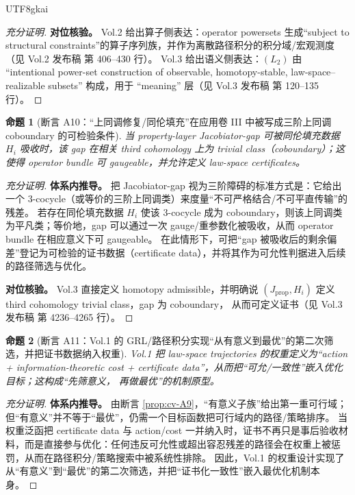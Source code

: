 \documentclass[12pt]{article}
\newtheorem{proposition}{命题}[section]
\begin{document}
\begin{CJK*}{UTF8}{gkai}
\begin{proof}[充分证明]
\textbf{对位核验。}
Vol.2 给出算子侧表达：operator powersets 生成“subject to structural constraints”的算子序列族，并作为离散路径积分的积分域/宏观测度（见 Vol.2
  发布稿\cite{GaoZhengAppVol2} 第 406--430 行）。
Vol.3 给出语义侧表达：$(L_2)$ 由 “intentional power-set construction of observable, homotopy-stable, law-space--realizable
  subsets” 构成，用于 “meaning” 层（见 Vol.3 发布稿\cite{GaoZhengAppVol3} 第 120--135 行）。
\end{proof}

\begin{proposition}[断言 A10：“上同调修复/同伦填充”在应用卷 III 中被写成三阶上同调 coboundary 的可检验条件]\label{prop:cv-A10}
当 property-layer Jacobiator-gap 可被同伦填充数据 $H_i$ 吸收时，该 gap 在相关 third cohomology 上为 trivial class（coboundary）；这使得 operator
  bundle 可 gaugeable，并允许定义 law-space certificates。
\end{proposition}

\begin{proof}[充分证明]
\textbf{体系内推导。}
把 Jacobiator-gap 视为三阶障碍的标准方式是：它给出一个 3-cocycle（或等价的三阶上同调类）来度量“不可严格结合/不可平直传输”的残差。
若存在同伦填充数据 $H_i$ 使该 3-cocycle 成为 coboundary，则该上同调类为平凡类；等价地，gap 可以通过一次 gauge/重参数化被吸收，从而 operator bundle 在相应意义下可 gaugeable。
在此情形下，可把“gap 被吸收后的剩余偏差”登记为可检验的证书数据（certificate data），并将其作为可允性判据进入后续的路径筛选与优化。

\textbf{对位核验。}
Vol.3 直接定义 homotopy admissible，并明确说 $(J_{\mathrm{prop}},H_i)$ 定义 third cohomology trivial class，gap 为 coboundary，
  从而可定义证书（见 Vol.3 发布稿\cite{GaoZhengAppVol3} 第 4236--4265 行）。
\end{proof}

\begin{proposition}[断言 A11：Vol.1 的 GRL/路径积分实现“从有意义到最优”的第二次筛选，并把证书数据纳入权重]\label{prop:cv-A11}
Vol.1 把 law-space trajectories 的权重定义为“action + information-theoretic cost + certificate data”，从而把“可允/一致性”嵌入优化目标；这构成“先筛意义，
  再做最优”的机制原型。
\end{proposition}

\begin{proof}[充分证明]
\textbf{体系内推导。}
由断言 \ref{prop:cv-A9}，“有意义子族”给出第一重可行域；但“有意义”并不等于“最优”，仍需一个目标函数把可行域内的路径/策略排序。
当权重泛函把 certificate data 与 action/cost 一并纳入时，证书不再只是事后验收材料，而是直接参与优化：任何违反可允性或超出容忍残差的路径会在权重上被惩罚，从而在路径积分/策略搜索中被系统性排除。
因此，Vol.1 的权重设计实现了从“有意义”到“最优”的第二次筛选，并把“证书化一致性”嵌入最优化机制本身。


\end{proof}
\end{CJK*}
\end{document}
